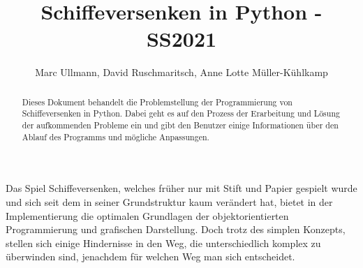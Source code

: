 \documentclass{llncs}
\begin{document}
%
%
%
\mainmatter              %
%
\title{Schiffeversenken in Python - SS2021}
%
\author{Marc Ullmann, David Ruschmaritsch, Anne Lotte Müller-Kühlkamp}
%

\maketitle              %

\begin{abstract}
Dieses Dokument behandelt die Problemstellung der Programmierung von Schiffeversenken in Python. Dabei geht es auf den Prozess der Erarbeitung und Lösung der aufkommenden Probleme ein und gibt den Benutzer einige Informationen über den Ablauf des Programms und mögliche Anpassungen.
\end{abstract}

Das Spiel Schiffeversenken, welches früher nur mit Stift und Papier gespielt wurde und sich seit dem in seiner Grundstruktur kaum verändert hat,
bietet in der Implementierung die optimalen Grundlagen der objektorientierten Programmierung und grafischen Darstellung. Doch trotz des simplen Konzepts,
stellen sich einige Hindernisse in den Weg, die unterschiedlich komplex zu überwinden sind, jenachdem für welchen Weg man sich entscheidet.
\end{document}
